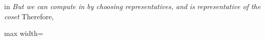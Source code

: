 \documentclass[11pt,oneside]{article}
\begin{document}
\begin{BookBody}
\noindent in  \textit{But we can compute in}  \textit{by choosing representatives, and}  \textit{is}  \textit{representative of the coset}  Therefore,

\begin{center}\begin{adjustbox}{max width=\linewidth}\end{adjustbox}\end{center}

\end{BookBody}

\BookNarrativetrue
\end{document}
